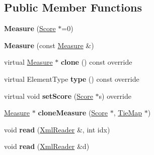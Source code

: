 \subsection*{Public Member Functions}
\begin{DoxyCompactItemize}
\item 
\mbox{\label{class_ms_1_1_measure_ad33228530386c218d91944ea77ef3719}} 
{\bfseries Measure} (\hyperlink{class_ms_1_1_score}{Score} $\ast$=0)
\item 
\mbox{\label{class_ms_1_1_measure_ad3f8454e27f876b92fffc321ad14afd1}} 
{\bfseries Measure} (const \hyperlink{class_ms_1_1_measure}{Measure} \&)
\item 
\mbox{\label{class_ms_1_1_measure_a86e8051e68a096681c18bb9625193d93}} 
virtual \hyperlink{class_ms_1_1_measure}{Measure} $\ast$ {\bfseries clone} () const override
\item 
\mbox{\label{class_ms_1_1_measure_a2c03fa69f56f3736668365bfce349f54}} 
virtual Element\+Type {\bfseries type} () const override
\item 
\mbox{\label{class_ms_1_1_measure_a4d429b75faea4736aa986b1453990ef6}} 
virtual void {\bfseries set\+Score} (\hyperlink{class_ms_1_1_score}{Score} $\ast$s) override
\item 
\mbox{\label{class_ms_1_1_measure_a49fc64b1c5a55ce7add66964178176c7}} 
\hyperlink{class_ms_1_1_measure}{Measure} $\ast$ {\bfseries clone\+Measure} (\hyperlink{class_ms_1_1_score}{Score} $\ast$, \hyperlink{class_ms_1_1_tie_map}{Tie\+Map} $\ast$)
\item 
\mbox{\label{class_ms_1_1_measure_af01d117ba83d46ce334966a3cbcead28}} 
void {\bfseries read} (\hyperlink{class_ms_1_1_xml_reader}{Xml\+Reader} \&, int idx)
\item 
\mbox{\label{class_ms_1_1_measure_ae90ce97cf72a49b2759c2e8c4b914b31}} 
void {\bfseries read} (\hyperlink{class_ms_1_1_xml_reader}{Xml\+Reader} \&d)
\item 
\mbox{\label{class_ms_1_1_measure_a4f50157525d2d0ad202d88b51fe2f093}} 

\end{DoxyCompactItemize}
